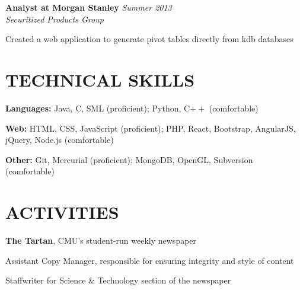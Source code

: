 \documentclass[margin, 11pt]{res} %
\begin{document}
\begin{resume}
\vspace{3pt}

{\bf Analyst at Morgan Stanley} \hfill {\sl Summer 2013} \\
{\sl Securitized Products Group}
\begin{itemize} \itemsep -2pt %
{\small
\item Created a web application to generate pivot tables directly from kdb databases
}
\end{itemize}


\section{TECHNICAL SKILLS}

{\bf Languages:}
Java, C, SML (proficient); Python, C$++$ (comfortable)

\vspace{5pt}

{\bf Web:}
HTML, CSS, JavaScript (proficient); PHP, React, Bootstrap, AngularJS, jQuery, Node.js (comfortable)

\vspace{5pt}

{\bf Other:}
Git, Mercurial (proficient); MongoDB, OpenGL, Subversion (comfortable)


\section{ACTIVITIES}

{\bf The Tartan}, CMU's student-run weekly newspaper

\begin{itemize} \itemsep -2pt
{\small \item Assistant Copy Manager, responsible for ensuring integrity and style of content
\item Staffwriter for Science \& Technology section of the newspaper}
\end{itemize}


\end{resume}
\end{document}
